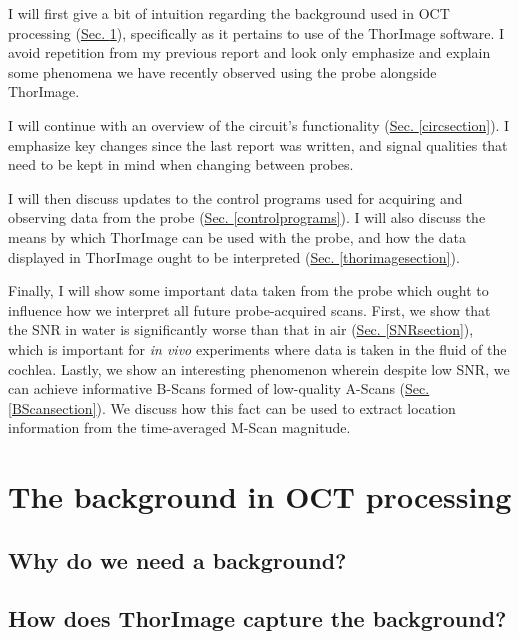 \documentclass{article}
\begin{document}
\par{I will first give a bit of intuition regarding the background used in OCT processing (\hyperlink{bgsection}{Sec. \ref{bgsection}}), specifically as it pertains to use of the ThorImage software. I avoid repetition from my previous report and look only emphasize and explain some phenomena we have recently observed using the probe alongside ThorImage.}
\par{I will continue with an overview of the circuit's functionality (\hyperlink{circsection}{Sec. \ref{circsection}}). I emphasize key changes since the last report was written, and signal qualities that need to be kept in mind when changing between probes.}
\par{I will then discuss updates to the control programs used for acquiring and observing data from the probe (\hyperlink{controlprograms}{Sec. \ref{controlprograms}}). I will also discuss the means by which ThorImage can be used with the probe, and how the data displayed in ThorImage ought to be interpreted (\hyperlink{thorimagesection}{Sec. \ref{thorimagesection}}).}
\par{Finally, I will show some important data taken from the probe which ought to influence how we interpret all future probe-acquired scans. First, we show that the SNR in water is significantly worse than that in air (\hyperlink{SNRsection}{Sec. \ref{SNRsection}}), which is important for \textit{in vivo} experiments where data is taken in the fluid of the cochlea. Lastly, we show an interesting phenomenon wherein despite low SNR, we can achieve informative B-Scans formed of low-quality A-Scans (\hyperlink{BScansection}{Sec. \ref{BScansection}}). We discuss how this fact can be used to extract location information from the time-averaged M-Scan magnitude.}

\section{The background in OCT processing}\label{bgsection}
\hypertarget{bgsection}{}

\par{}

\subsection{Why do we need a background?}

\par{}

\subsection{How does ThorImage capture the background?}
\end{document}
